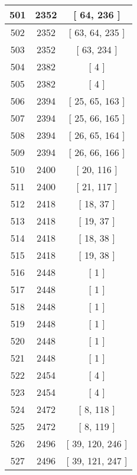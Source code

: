 \begin{center}
\begin{longtable}[H]{|| c c c ||}
\hline
501 & 2352 & [ 64, 236 ] \\ 
\hline
502 & 2352 & [ 63, 64, 235 ] \\ 
\hline
503 & 2352 & [ 63, 234 ] \\ 
\hline
504 & 2382 & [ 4 ] \\ 
\hline
505 & 2382 & [ 4 ] \\ 
\hline
506 & 2394 & [ 25, 65, 163 ] \\ 
\hline
507 & 2394 & [ 25, 66, 165 ] \\ 
\hline
508 & 2394 & [ 26, 65, 164 ] \\ 
\hline
509 & 2394 & [ 26, 66, 166 ] \\ 
\hline
510 & 2400 & [ 20, 116 ] \\ 
\hline
511 & 2400 & [ 21, 117 ] \\ 
\hline
512 & 2418 & [ 18, 37 ] \\ 
\hline
513 & 2418 & [ 19, 37 ] \\ 
\hline
514 & 2418 & [ 18, 38 ] \\ 
\hline
515 & 2418 & [ 19, 38 ] \\ 
\hline
516 & 2448 & [ 1 ] \\ 
\hline
517 & 2448 & [ 1 ] \\ 
\hline
518 & 2448 & [ 1 ] \\ 
\hline
519 & 2448 & [ 1 ] \\ 
\hline
520 & 2448 & [ 1 ] \\ 
\hline
521 & 2448 & [ 1 ] \\ 
\hline
522 & 2454 & [ 4 ] \\ 
\hline
523 & 2454 & [ 4 ] \\ 
\hline
524 & 2472 & [ 8, 118 ] \\ 
\hline
525 & 2472 & [ 8, 119 ] \\ 
\hline
526 & 2496 & [ 39, 120, 246 ] \\ 
\hline
527 & 2496 & [ 39, 121, 247 ] \\ 
\hline
\end{longtable}
\end{center}

